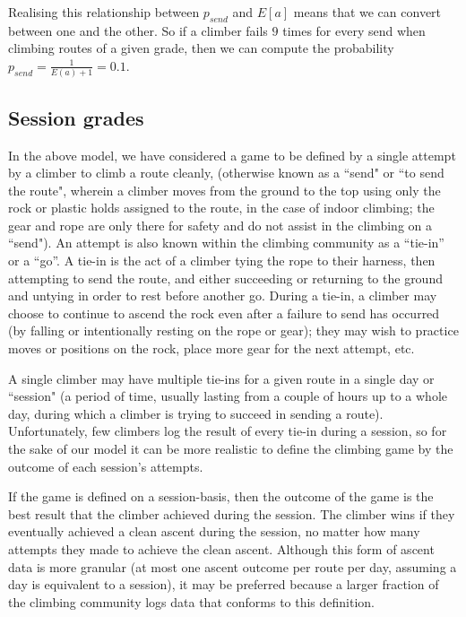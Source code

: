 \documentclass{article}
\begin{document}
Realising this relationship between $p_{send}$ and $ E\left[a\right]$ means that we can convert between one and the other. So if a climber fails $9$ times for every send when climbing routes of a given grade, then we can compute the probability  $p_{send} = \frac{1}{E(a)+1} = 0.1$.

\subsection*{Session grades}

In the above model, we have considered a game to be defined by a single attempt by a climber to climb a route cleanly, (otherwise known as a ``send" or ``to send the route", wherein a climber moves from the ground to the top using only the rock or plastic holds assigned to the route, in the case of indoor climbing; the gear and rope are only there for safety and do not assist in the climbing on a ``send"). An attempt is also known within the climbing community as a ``tie-in'' or a ``go''. A tie-in is the act of a climber tying the rope to their harness, then attempting to send the route, and either succeeding or returning to the ground and untying in order to rest before another go.  During a tie-in, a climber may choose to continue to ascend the rock even after a failure to send has occurred (by falling or intentionally resting on the rope or gear); they may wish to practice moves or positions on the rock, place more gear for the next attempt, etc.

A single climber may have multiple tie-ins for a given route in a single day or ``session" (a period of time, usually lasting from a couple of hours up to a whole day, during which a climber is trying to succeed in sending a route).  Unfortunately, few climbers log the result of every tie-in during a session, so for the sake of our model it can be more realistic to define the climbing game by the outcome of each session's attempts.

If the game is defined on a session-basis, then the outcome of the game is the best result that the climber achieved during the session. The climber wins if they eventually achieved a clean ascent during the session, no matter how many attempts they made to achieve the clean ascent. Although this form of ascent data is more granular (at most one ascent outcome per route per day, assuming a day is equivalent to a session), it may be preferred because a larger fraction of the climbing community logs data that conforms to this definition. 
\end{document}
